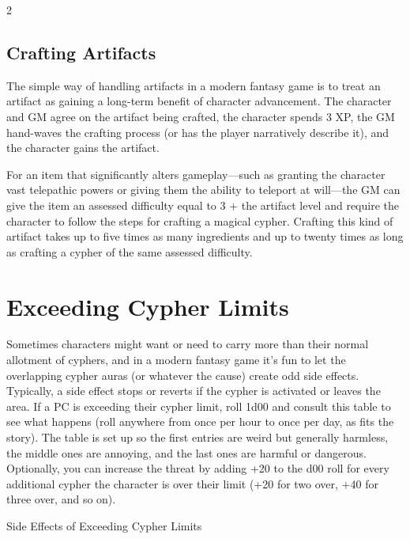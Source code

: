 \begin{multicols}{2}

\section{Crafting Artifacts}
 
The simple way of handling artifacts in a modern fantasy game is to treat an artifact as gaining a long-term benefit of character advancement. The character and GM agree on the artifact being crafted, the character spends 3 XP, the GM hand-waves the crafting process (or has the player narratively describe it), and the character gains the artifact. 

For an item that significantly alters gameplay—such as granting the character vast telepathic powers or giving them the ability to teleport at will—the GM can give the item an assessed difficulty equal to 3 + the artifact level and require the character to follow the steps for crafting a magical cypher. Crafting this kind of artifact takes up to five times as many ingredients and up to twenty times as long as crafting a cypher of the same assessed difficulty.

\chapter{Exceeding Cypher Limits}

Sometimes characters might want or need to carry more than their normal allotment of cyphers, and in a modern fantasy game it’s fun to let the overlapping cypher auras (or whatever the cause) create odd side effects. Typically, a side effect stops or reverts if the cypher is activated or leaves the area. If a PC is exceeding their cypher limit, roll 1d00 and consult this table to see what happens (roll anywhere from once per hour to once per day, as fits the story). The table is set up so the first entries are weird but generally harmless, the middle ones are annoying, and the last ones are harmful or dangerous. Optionally, you can increase the threat by adding +20 to the d00 roll for every additional cypher the character is over their limit (+20 for two over, +40 for three over, and so on).

Side Effects of Exceeding Cypher Limits 

\end{multicols}


